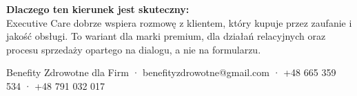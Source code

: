 \documentclass[12pt,a4paper]{article}
\begin{document}
\vspace{0.5cm}

\begin{mdframed}[backgroundcolor=surface, linecolor=brand, linewidth=1.5pt, innerleftmargin=12pt, innerrightmargin=12pt, innertopmargin=10pt, innerbottommargin=10pt]
  \textbf{\color{brand}Dlaczego ten kierunek jest skuteczny:}\\[4pt]
  Executive Care dobrze wspiera rozmowę z klientem, który kupuje przez zaufanie i jakość obsługi. To wariant dla marki premium, dla działań relacyjnych oraz procesu sprzedaży opartego na dialogu, a nie na formularzu.
\end{mdframed}

\vspace{1.5cm}
\begin{center}
  \color{inkMid}\small
  Benefity Zdrowotne dla Firm · benefityzdrowotne@gmail.com · +48 665 359 534 · +48 791 032 017
\end{center}
\end{document}
